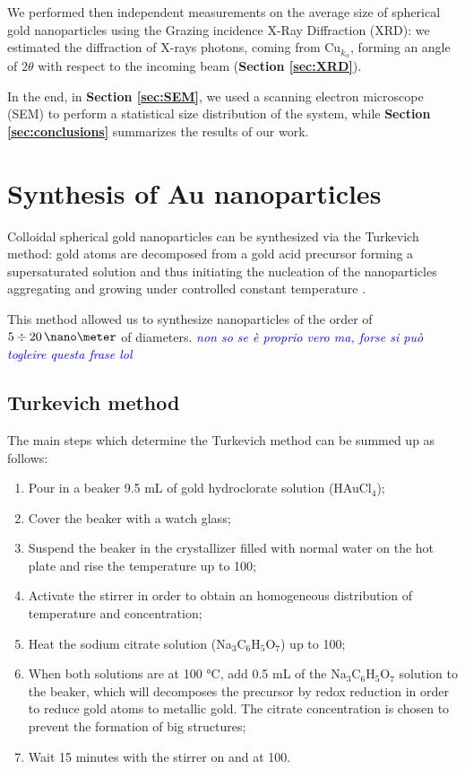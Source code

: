 \documentclass[twocolumn]{article}
\newcommand{\gio}[1]{\textcolor{blue}{\textit{#1}}}
\begin{document}
\begin{multicols}{2}
We performed then independent measurements on the average size of spherical gold nanoparticles using the Grazing incidence X-Ray Diffraction (XRD): we estimated the diffraction of X-rays photons, coming from \(\text{Cu}_{k_\alpha}\), forming an angle of \(2\theta\) with respect to the incoming beam (\textbf{Section \ref{sec:XRD}}).

In the end, in \textbf{Section \ref{sec:SEM}}, we used a scanning electron microscope (SEM) to perform a statistical size distribution of the system, while \textbf{Section \ref{sec:conclusions}} summarizes the results of our work.

\newpage

\section{Synthesis of Au nanoparticles}
\label{sec:synthesis}
\noindent
Colloidal spherical gold nanoparticles can be synthesized via the Turkevich method: gold atoms are decomposed from a gold acid precursor forming a supersaturated solution and thus initiating the nucleation of the nanoparticles aggregating and growing under controlled constant temperature \cite{Kimling2006}.

This method allowed us to synthesize nanoparticles of the order of $5 \div 20 \,\nano\meter$ of diameters. \gio{non so se è proprio vero ma, forse si può togleire questa frase lol}

\subsection{Turkevich method}
The main steps which determine the Turkevich method can be summed up as follows:

\begin{enumerate}
    \item Pour in a beaker 9.5 mL of gold hydroclorate solution (HAuCl$_4$);
    \item Cover the beaker with a watch glass;
    \item Suspend the beaker in the crystallizer filled with normal water on the hot plate and rise the temperature up to 100\degreecelsius;
    \item Activate the stirrer in order to obtain an homogeneous distribution of temperature and concentration;
    \item Heat the sodium citrate solution (Na$_3$C$_6$H$_5$O$_7$) up to 100\degreecelsius;
    \item When both solutions are at 100 °C, add 0.5 mL of the Na$_3$C$_6$H$_5$O$_7$ solution to the beaker, which will decomposes the precursor by redox reduction in order to reduce gold atoms to metallic gold. The citrate concentration is chosen to prevent the formation of big structures;
    \item Wait 15 minutes with the stirrer on and at 100\degreecelsius.
\end{enumerate}


\end{multicols}
\end{document}
